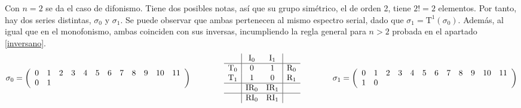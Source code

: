		Con $n=2$ se da el caso de difonismo. Tiene dos posibles notas, así que su grupo simétrico, el de orden 2, tiene $2!=2$ elementos. Por tanto, hay dos series distintas, $\sigma_0$ y $\sigma_1$. Se puede observar que ambas pertenecen al mismo espectro serial, dado que $\sigma_1=\mbox{T}^1(\sigma_0)$. Además, al igual que en el monofonismo, ambas coinciden con sus inversas, incumpliendo la regla general para $n>2$ probada en el apartado \ref{inversano}.
		\[\sigma_0=\drow{0,1}
		\qquad\qquad
		\begin{array}{l|cc|r}
			&\mbox{I}_{0}&\mbox{I}_{1}&\\
			\hline
			\mbox{T}_{0}&0&1&\mbox{R}_{0}\\
			\mbox{T}_{1}&1&0&\mbox{R}_{1}\\
			\hline
			&\mbox{IR}_{0}&\mbox{IR}_{1}&\\
			\hline
			&\mbox{RI}_{0}&\mbox{RI}_{1}&
		\end{array}
		\qquad\qquad
		\sigma_1=\drow{1,0}\]